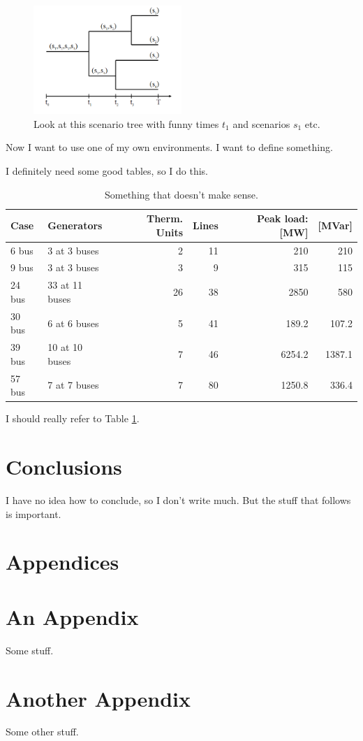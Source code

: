 \documentclass[11pt,twoside]{article}
\numberwithin{Theorem}{section}
\numberwithin{Definition}{section}
\numberwithin{Lemma}{section}
\numberwithin{Algorithm}{section}
\numberwithin{equation}{section}
\begin{document}
\begin{figure}[!ht]
\centering
\includegraphics[width=0.5\textwidth]{scenTree.png}
\caption{Look at this scenario tree with funny times $t_{1}$ and scenarios $s_{1}$ etc.}
\label{fig:scenarioTree}
\end{figure}
Now I want to use one of my own environments. I want to define something.

I definitely need some good tables, so I do this.
\begin{table}[!ht]
\centering
\begin{tabular}{|ll|rrrr|}
\hline
Case&Generators&Therm. Units&Lines&Peak load: [MW]&[MVar]\\
\hline\hline
6 bus&3 at 3 buses&2&11&210&210\\
9 bus&3 at 3 buses&3&9&315&115\\
24 bus&33 at 11 buses&26&38&2850&580\\
30 bus&6 at 6 buses&5&41&189.2&107.2\\
39 bus&10 at 10 buses&7&46&6254.2&1387.1\\
57 bus&7 at 7 buses&7&80&1250.8&336.4\\
\hline
\end{tabular}
\caption{Something that doesn't make sense.}
\label{tab:things}
\end{table}
I should really refer to Table \ref{tab:things}.


\section{Conclusions}
I have no idea how to conclude, so I don't write much. But the stuff that follows is important.
\clearpage



\clearpage

\appendix
\section*{Appendices}

\section{An Appendix}
\label{app:one}

Some stuff.
\clearpage

\section{Another Appendix}
\label{app:two}

Some other stuff.
\end{document}
